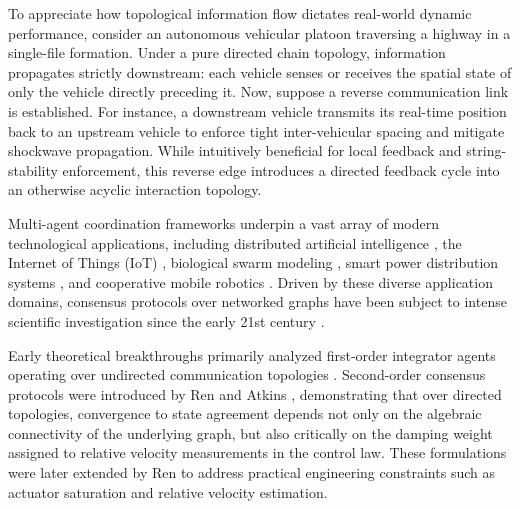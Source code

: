 To appreciate how topological information flow dictates real-world dynamic performance, consider an autonomous vehicular platoon traversing a highway in a single-file formation. Under a pure directed chain topology, information propagates strictly downstream: each vehicle senses or receives the spatial state of only the vehicle directly preceding it. Now, suppose a reverse communication link is established. For instance, a downstream vehicle transmits its real-time position back to an upstream vehicle to enforce tight inter-vehicular spacing and mitigate shockwave propagation. While intuitively beneficial for local feedback and string-stability enforcement, this reverse edge introduces a directed feedback cycle into an otherwise acyclic interaction topology.

Multi-agent coordination frameworks underpin a vast array of modern technological applications, including distributed artificial intelligence \cite{alonso2001learning}, the Internet of Things (IoT) \cite{liang2020intrusion}, biological swarm modeling \cite{rodin2004immune}, smart power distribution systems \cite{catterson2012practical}, and cooperative mobile robotics \cite{hu2000multi}. Driven by these diverse application domains, consensus protocols over networked graphs have been subject to intense scientific investigation since the early 21st century \cite{saber2003consensus, jadbabaie2003coordination, fax2004information}.

Early theoretical breakthroughs primarily analyzed first-order integrator agents operating over undirected communication topologies \cite{1333204, jadbabaie2003coordination, moreau2005stability}. Second-order consensus protocols were introduced by Ren and Atkins \cite{ren2005second}, demonstrating that over directed topologies, convergence to state agreement depends not only on the algebraic connectivity of the underlying graph, but also critically on the damping weight assigned to relative velocity measurements in the control law. These formulations were later extended by Ren \cite{ren2008consensus} to address practical engineering constraints such as actuator saturation and relative velocity estimation.

